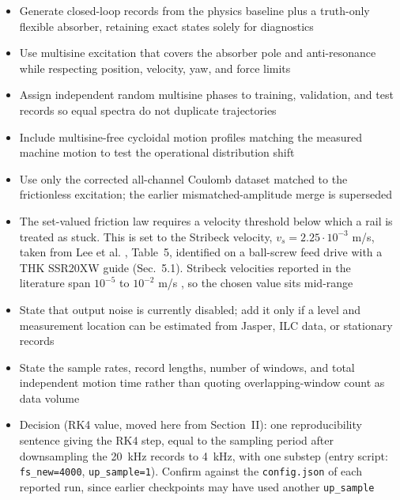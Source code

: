 \begin{wip}
\begin{itemize}
\item Generate closed-loop records from the physics baseline plus a truth-only flexible absorber, retaining exact states solely for diagnostics
\item Use multisine excitation that covers the absorber pole and anti-resonance while respecting position, velocity, yaw, and force limits
\item Assign independent random multisine phases to training, validation, and test records so equal spectra do not duplicate trajectories
\item Include multisine-free cycloidal motion profiles matching the measured machine motion to test the operational distribution shift
\item Use only the corrected all-channel Coulomb dataset matched to the frictionless excitation; the earlier mismatched-amplitude merge is superseded
\item The set-valued friction law requires a velocity threshold below which a rail is treated as stuck. This is set to the Stribeck velocity, $v_{s} = 2.25\cdot10^{-3}$ m/s, taken from Lee et al. \cite{lee2020feeddrive}, Table~5, identified on a ball-screw feed drive with a THK SSR20XW guide (Sec.~5.1). Stribeck velocities reported in the literature span $10^{-5}$ to $10^{-2}$ m/s \cite[Sec.~5.2]{lee2020feeddrive}, so the chosen value sits mid-range
\item State that output noise is currently disabled; add it only if a level and measurement location can be estimated from Jasper, ILC data, or stationary records
\item State the sample rates, record lengths, number of windows, and total independent motion time rather than quoting overlapping-window count as data volume
\item Decision (RK4 value, moved here from Section~II): one reproducibility sentence giving the RK4 step, equal to the sampling period after downsampling the 20~kHz records to 4~kHz, with one substep (entry script: \texttt{fs\_new=4000}, \texttt{up\_sample=1}). Confirm against the \texttt{config.json} of each reported run, since earlier checkpoints may have used another \texttt{up\_sample}

\end{itemize}
\end{wip}
